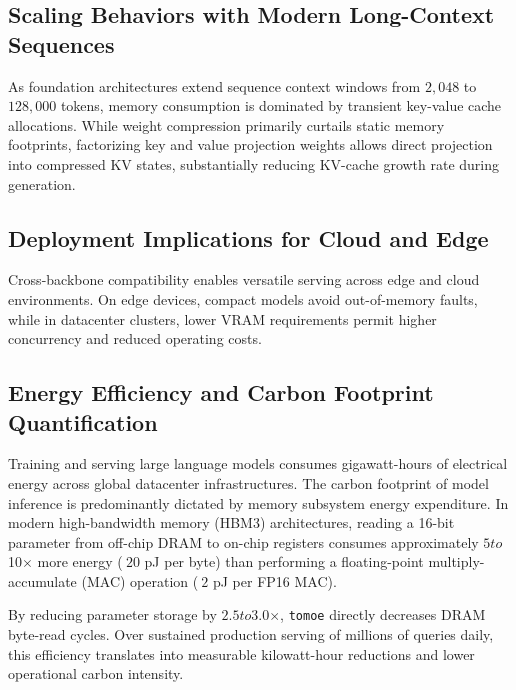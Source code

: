 \subsection{Scaling Behaviors with Modern Long-Context Sequences}
As foundation architectures extend sequence context windows from $2{,}048$ to $128{,}000$ tokens, memory consumption is dominated by transient key-value cache allocations. While weight compression primarily curtails static memory footprints, factorizing key and value projection weights allows direct projection into compressed KV states, substantially reducing KV-cache growth rate during generation.

\subsection{Deployment Implications for Cloud and Edge}
Cross-backbone compatibility enables versatile serving across edge and cloud environments. On edge devices, compact models avoid out-of-memory faults, while in datacenter clusters, lower VRAM requirements permit higher concurrency and reduced operating costs.

\subsection{Energy Efficiency and Carbon Footprint Quantification}
Training and serving large language models consumes gigawatt-hours of electrical energy across global datacenter infrastructures. The carbon footprint of model inference is predominantly dictated by memory subsystem energy expenditure. In modern high-bandwidth memory (HBM3) architectures, reading a 16-bit parameter from off-chip DRAM to on-chip registers consumes approximately $5$\times$ to $10$\times$ more energy ($~20$ pJ per byte) than performing a floating-point multiply-accumulate (MAC) operation ($~2$ pJ per FP16 MAC).

By reducing parameter storage by $2.5$\times$ to $3.0$\times$, \texttt{tomoe} directly decreases DRAM byte-read cycles. Over sustained production serving of millions of queries daily, this efficiency translates into measurable kilowatt-hour reductions and lower operational carbon intensity.

